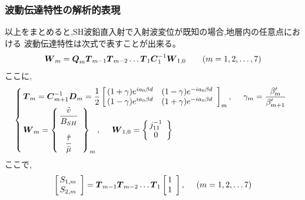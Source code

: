 \documentclass[titlepage]{jsarticle}
\def\dfrac#1#2{{\displaystyle\frac{#1}{#2}}}
\def\Matrix#1{{\mbox{\boldmath $#1$}}}
\begin{document}
\subsubsection{波動伝達特性の解析的表現}
以上をまとめると,SH波鉛直入射で入射波変位が既知の場合,地層内の任意点における
波動伝達特性は次式で表すことが出来る。
\begin{equation}
\Matrix{W} _m = \Matrix{Q} _m \Matrix{T} _{m-1} \Matrix{T} _{m-2} \ldots 
                \Matrix{T} _1 \Matrix{C} ^{-1}_1 \Matrix{W} _{1,0}
~~~~~~(m=1,2,\ldots ,7) \label{dentoku}
\end{equation}
ここに,
\begin{equation}
\left\{
\begin{array}{@{\,}l}
\Matrix{T} _m = \Matrix{C} ^{-1}_{m+1} \Matrix{D} _m = \dfrac{1}{2} \left[
                \begin{array}{@{\,}cc}
                (1 + \gamma )e^{ia_0 \beta d} & (1 - \gamma )e^{-ia_0 \beta d} \\
                (1 - \gamma )e^{ia_0 \beta d} & (1 + \gamma )e^{-ia_0 \beta d}
                \end{array} \right] _m ,~~~~
\gamma _m = \dfrac{\beta '_m}{\beta '_{m+1}} \\
\Matrix{W} _m = \left\{
                \begin{array}{@{\,}c}
                \dfrac{\tilde{v} }{B_{SH}} \\ \\
                \dfrac{\tilde{\tau } }{\bar{\mu }} 
                \end{array} \right\} _m ,~~~~
\Matrix{W} _{1,0} = \left\{ 
                    \begin{array}{@{\,}c}
                    j^{-1}_{11} \\
                    0 
                    \end{array} \right\}
\end{array} \right. \label{kokoni}
\end{equation}
ここで,
\begin{equation}
\left[ \begin{array}{@{\,}c}
S_{1,m} \\
S_{2,m} \end{array} \right]
 = \Matrix{T} _{m-1} \Matrix{T} _{m-2} \ldots \Matrix{T} _1
\left[ \begin{array}{@{\,}c}
1 \\
1 \end{array} \right] ,~~~~(m=1,2,\ldots 7) \label{smatrix}
\end{equation}
\end{document}
